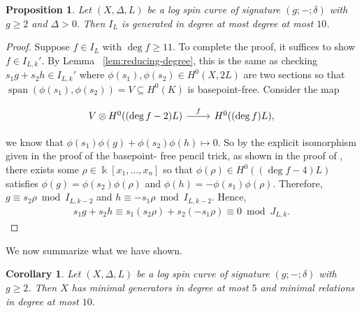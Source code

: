 \documentclass{amsart}
\theoremstyle{plain}
\newtheorem{prop}[thm]{Proposition}
\newtheorem{cor}[thm]{Corollary}
\theoremstyle{definition}
\theoremstyle{remark}
\newtheorem{rem}[thm]{Remark}
\numberwithin{equation}{section}
\newcommand\Bk{{\Bbbk}}
\newcommand{\halfcan}{L}
\DeclareMathOperator{\newspan}{span}
\begin{document}
\begin{prop}
\label{prop:relation-10}
Let $(X, \Delta, \halfcan)$ be a log spin curve of signature $(g; -; \delta)$
 with $g \geq 2$ and $\Delta > 0.$ Then $I_\halfcan$ is generated in
degree at most degree at most $10$.
\end{prop}
\begin{proof}
Suppose $f \in I_\halfcan$ with $\deg f \geq 11$. To complete the proof,
it suffices to show $f \in I_{\halfcan,k}'$. By Lemma
~\ref{lem:reducing-degree}, this is the same as checking $s_1 g + s_2 h \in
I_{\halfcan, k}'$ where $\phi(s_ 1), \phi(s_2) \in H^0(X, 2L)$ are two sections
so that $\newspan(\phi(s_ 1), \phi(s_2)) = V \subseteq H^0(K)$ is
basepoint-free. Consider the map

$$\begin{tikzcd}
V \otimes H^0((\deg f - 2)L) \ar {r}{f} & H^0((\deg f)L),
\end{tikzcd}$$

\noindent
we know that $\phi(s_1)\phi(g) + \phi(s_2) \phi(h) \mapsto 0$.
So by the explicit isomorphism given in the proof of the basepoint-
free pencil trick, as shown in the proof of \cite[Lemma 2.6]
{saint-donat:proj}, there exists some $\rho \in \Bk[x_1, \ldots, x_n]$
so that $\phi(\rho) \in H^0((\deg f - 4)L)$ satisfies $\phi(g) =
\phi(s_2) \phi(\rho)$ and $\phi(h) = -\phi(s_1)\phi(\rho)$. 
Therefore,
$g \equiv s_2 \rho \bmod I_{\halfcan, k-2}$ and $h \equiv - s_1 \rho \bmod
I_{\halfcan, k - 2}$. Hence,
\begin{align*}
	s_1g + s_2h \equiv s_1(s_2\rho) + s_2(-s_1 \rho) \equiv 0 \bmod J_
{L,k}.
\end{align*}
\end{proof}


We now summarize what we have shown.

\begin{cor}
\label{cor:g-2-presentation-bound}
Let $(X, \Delta, L)$ be a log spin curve of signature $(g; -;\delta)$
with $g \geq 2$. Then $X$ has minimal generators in degree at most
$5$ and minimal relations in degree at most $10$.
\end{cor}
\end{document}
